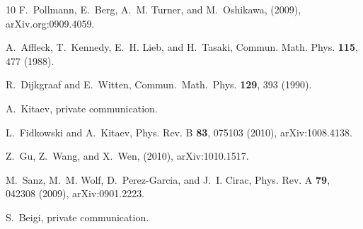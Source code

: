 \documentclass[twocolumn,superscriptaddress,prb,linenumbers]{revtex4-1}
\begin{document}
\begin{thebibliography}{10}
    F.~Pollmann, E.~Berg, A.~M. Turner, and M.~Oshikawa,
    \newblock (2009), arXiv.org:0909.4059.

    A.~Affleck, T.~Kennedy, E.~H. Lieb, and H.~Tasaki,
    \newblock Commun. Math. Phys. {\bf 115}, 477 (1988).

    R.~Dijkgraaf and E.~Witten,
    \newblock Commun.\ Math.\ Phys. {\bf 129}, 393 (1990).

    A.~Kitaev, private communication.

    L.~{Fidkowski} and A.~{Kitaev},
    \newblock Phys. Rev. B {\bf 83}, 075103 (2010), arXiv:1008.4138.

    Z.~{Gu}, Z.~{Wang}, and X.~{Wen},
    \newblock (2010), arXiv:1010.1517.

    M.~Sanz, M.~M. Wolf, D.~Perez-Garcia, and J.~I. Cirac,
    \newblock Phys. Rev. A {\bf 79}, 042308 (2009), arXiv:0901.2223.

    S.~Beigi, private communication.

\end{thebibliography}
\end{document}
